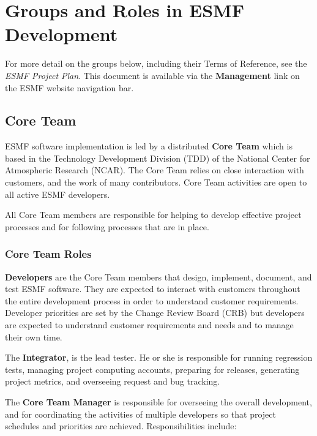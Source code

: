 
\section{Groups and Roles in ESMF Development}

For more detail on the groups below, including their Terms of
Reference, see the {\it ESMF Project Plan}\cite{bib:ESMFprojectplan}.
This document is available via the {\bf Management} link on 
the ESMF website navigation bar.

\subsection{Core Team}
ESMF software implementation is led by a distributed {\bf Core Team} which is based in the 
Technology Development Division (TDD) of the National Center for
Atmospheric Research (NCAR).  The Core Team relies on close interaction
with customers, and the work of many contributors.  Core Team
activities are open to all active ESMF developers.

All Core Team members are responsible for helping to 
develop effective project processes and for following
processes that are in place.


\subsubsection{Core Team Roles}

{\bf Developers} are the Core Team members that design, implement, document, and test
ESMF software.  They are expected to interact with customers throughout the entire
development process in order to understand customer requirements.  Developer priorities are set by the Change Review Board (CRB) but developers are expected to understand customer requirements and
needs and to manage their own time.

The {\bf Integrator}, is the lead tester. He or she is responsible for running regression
tests, managing project computing accounts, preparing for releases,
generating project metrics, and overseeing request and bug tracking.

The {\bf Core Team Manager} is responsible for overseeing the overall development, and 
for coordinating the activities of multiple developers
so that project schedules and priorities are achieved.
Responsibilities include:

